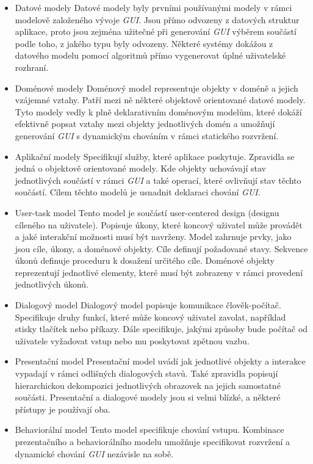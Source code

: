 \documentclass[11pt,twoside,a4paper]{book}
\begin{document}
\begin{itemize}
\item Datové modely
Datové modely byly prvními používanými modely v rámci modelově založeného vývoje \textit{GUI}. Jsou přímo odvozeny z datových struktur aplikace, proto jsou zejména užitečné při generování \textit{GUI} výběrem součástí podle toho, z jakého typu byly odvozeny. Některé systémy dokážou z datového modelu pomocí algoritmů přímo vygenerovat úplné uživatelské rozhraní. \cite{bib:model2}
\item Doménové modely
Doménový model representuje objekty v doméně a jejich vzájemné vztahy. Patří mezi ně některé objektově orientované datové modely. Tyto modely vedly k plně deklarativním doménovým modelům, které dokáží efektivně popsat vztahy mezi objekty jednotlivých domén a umožňují generování \textit{GUI} s dynamickým chováním v rámci statického rozvržení.
\item Aplikační modely
Specifikují služby, které aplikace poskytuje. Zpravidla se jedná o objektově orientované modely. Kde objekty uchovávají stav jednotlivých součástí v rámci \textit{GUI} a také operací, které ovlivňují stav těchto součástí. Cílem těchto modelů je usnadnit deklaraci chování \textit{GUI}.
\item User-task model
Tento model je součástí user-centered design (designu cíleného na uživatele). Popisuje úkony, které koncový uživatel může provádět a jaké interakční možnosti musí být navrženy. Model zahrnuje prvky, jako jsou cíle, úkony, a doménové objekty. Cíle definují požadované stavy. Sekvence úkonů definuje proceduru k dosažení určitého cíle. Doménové objekty reprezentují jednotlivé elementy, které musí být zobrazeny v rámci provedení jednotlivých úkonů.
\item Dialogový model
Dialogový model popisuje komunikace člověk-počítač. Specifikuje druhy funkcí, které může koncový uživatel zavolat, například stisky tlačítek nebo příkazy. Dále specifikuje, jakými způsoby bude počítač od uživatele vyžadovat vstup nebo mu poskytovat zpětnou vazbu.
\item Presentační model
Presentační model uvádí jak jednotlivé objekty a interakce vypadají v rámci odlišných dialogových stavů. Také zpravidla popisují hierarchickou dekompozici jednotlivých obrazovek na jejich samostatné součásti. Presentační a dialogové modely jsou si velmi blízké, a některé přístupy je používají oba.
\item Behaviorální model
Tento model specifikuje chování vstupu. Kombinace prezentačního a behaviorálního modelu umožňuje specifikovat rozvržení a dynamické chování \textit{GUI} nezávisle na sobě.
\end{itemize}
\end{document}
